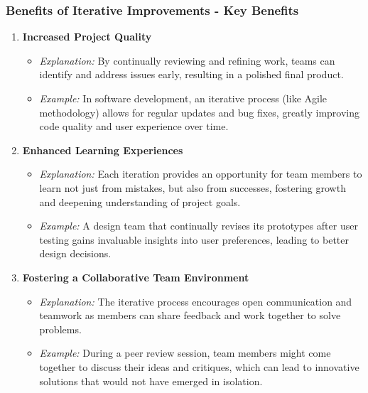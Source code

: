 \documentclass{beamer}
\begin{document}
\begin{frame}[fragile]
    \frametitle{Benefits of Iterative Improvements - Key Benefits}
    \begin{enumerate}
        \item \textbf{Increased Project Quality}
        \begin{itemize}
            \item \textit{Explanation:} By continually reviewing and refining work, teams can identify and address issues early, resulting in a polished final product.
            \item \textit{Example:} In software development, an iterative process (like Agile methodology) allows for regular updates and bug fixes, greatly improving code quality and user experience over time.
        \end{itemize}
        
        \item \textbf{Enhanced Learning Experiences}
        \begin{itemize}
            \item \textit{Explanation:} Each iteration provides an opportunity for team members to learn not just from mistakes, but also from successes, fostering growth and deepening understanding of project goals.
            \item \textit{Example:} A design team that continually revises its prototypes after user testing gains invaluable insights into user preferences, leading to better design decisions.
        \end{itemize}
        
        \item \textbf{Fostering a Collaborative Team Environment}
        \begin{itemize}
            \item \textit{Explanation:} The iterative process encourages open communication and teamwork as members can share feedback and work together to solve problems.
            \item \textit{Example:} During a peer review session, team members might come together to discuss their ideas and critiques, which can lead to innovative solutions that would not have emerged in isolation.
        \end{itemize}
    \end{enumerate}
\end{frame}
\end{document}
